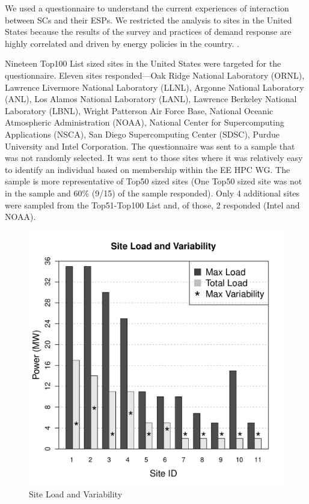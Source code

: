 We used a questionnaire to understand the current experiences of interaction between
SCs and their ESPs. We restricted the analysis to sites in the United States
because the results of the survey and practices of demand response are highly
correlated and driven by energy policies in the country. 
\cite{torriti_demand_2010}.

Nineteen Top100 List sized sites in the United States were targeted for the
questionnaire. Eleven sites responded---Oak Ridge National Laboratory (ORNL), 
Lawrence Livermore National Laboratory (LLNL), 
Argonne National Laboratory (ANL), 
Los Alamos National Laboratory (LANL), 
Lawrence Berkeley National Laboratory (LBNL), 
Wright Patterson Air Force Base,
National Oceanic Atmospheric Administration (NOAA), 
National Center for Supercomputing Applications (NSCA), 
San Diego Supercomputing Center (SDSC), 
Purdue University and Intel Corporation. The questionnaire was
sent to a sample that was not randomly selected. It was sent to those sites
where it was relatively easy to identify an individual based on membership
within the EE HPC WG. The sample is more representative of Top50 sized sites
(One Top50 sized site was not in the sample and 60{\%} (9/15) of the sample
responded). Only 4 additional sites were sampled from the Top51-Top100 List
and, of those, 2 responded (Intel and NOAA).
\begin{figure}[htbp]
\begin{center}
\includegraphics[scale=0.45]{NewGraphs/Table1-graph.pdf}
\caption{Site Load and Variability}
\label{figGraph1}
\end{center}
\end{figure}

